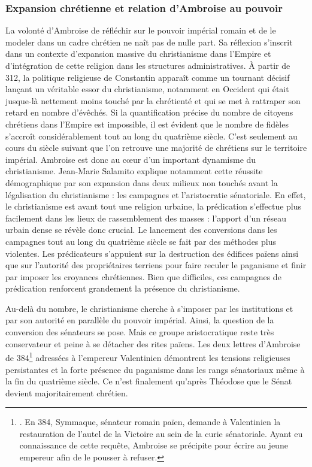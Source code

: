 \bigskip

\subsubsection*{Expansion chrétienne et relation d'Ambroise au pouvoir}

La volonté d'Ambroise de réfléchir sur le pouvoir impérial romain et de le modeler dans un cadre chrétien ne naît pas de nulle part. Sa réflexion s'inscrit dans un contexte d'expansion massive du christianisme dans l’Empire et d’intégration de cette religion dans les structures administratives. À partir de 312, la politique religieuse de Constantin apparaît comme un tournant décisif lançant un véritable essor du christianisme, notamment en Occident qui était jusque-là nettement moins touché par la chrétienté et qui se met à rattraper son retard en nombre d’évêchés\autocite[677]{salamito_christianisation_1995}. Si la quantification précise du nombre de citoyens chrétiens dans l'Empire est impossible, il est évident que le nombre de fidèles s'accroît considérablement tout au long du quatrième siècle. C'est seulement au cours du siècle suivant que l'on retrouve une majorité de chrétiens sur le territoire impérial. Ambroise est donc au cœur d'un important dynamisme du christianisme. Jean-Marie Salamito explique notamment cette réussite démographique par son expansion dans deux milieux non touchés avant la légalisation du christianisme : les campagnes et l’aristocratie sénatoriale\autocite[679-681]{salamito_christianisation_1995}. En effet, le christianisme est avant tout une religion urbaine, la prédication s’effectue plus facilement dans les lieux de rassemblement des masses : l’apport d’un réseau urbain dense se révèle donc crucial. Le lancement des conversions dans les campagnes tout au long du quatrième siècle se fait par des méthodes plus violentes. Les prédicateurs s’appuient sur la destruction des édifices païens ainsi que sur l’autorité des propriétaires terriens pour faire reculer le paganisme et finir par imposer les croyances chrétiennes. Bien que difficiles, ces campagnes de prédication renforcent grandement la présence du christianisme.

\bigskip

Au-delà du nombre, le christianisme cherche à s’imposer par les institutions et par son autorité en parallèle du pouvoir impérial. Ainsi, la question de la conversion des sénateurs se pose. Mais ce groupe aristocratique reste très conservateur et peine à se détacher des rites païens. Les deux lettres d’Ambroise de 384\footnote{\cite[ et 73]{ambroise_lettres}. En 384, Symmaque, sénateur romain païen, demande à Valentinien la restauration de l’autel de la Victoire au sein de la curie sénatoriale. Ayant eu connaissance de cette requête, Ambroise se précipite pour écrire au jeune empereur afin de le pousser à refuser.} adressées à l’empereur Valentinien démontrent les tensions religieuses persistantes et la forte présence du paganisme dans les rangs sénatoriaux même à la fin du quatrième siècle. Ce n’est finalement qu’après Théodose que le Sénat devient majoritairement chrétien.

